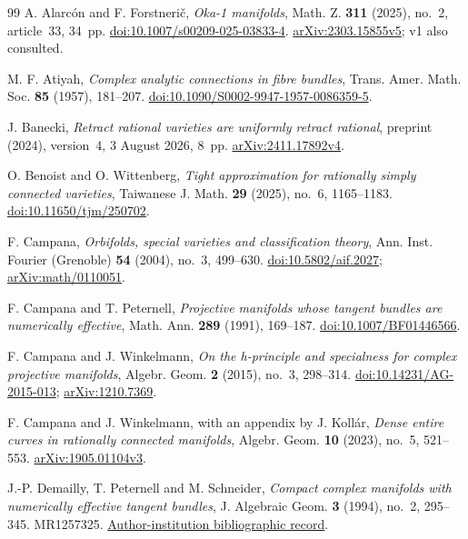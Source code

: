 \documentclass[12pt]{amsart}
\theoremstyle{definition}
\theoremstyle{remark}
\numberwithin{equation}{section}
\begin{document}
\begin{thebibliography}{99}
A. Alarc\'on and F. Forstneri\v c,
\emph{Oka-1 manifolds}, Math. Z. \textbf{311} (2025), no.~2, article~33, 34~pp.
\href{https://doi.org/10.1007/s00209-025-03833-4}{doi:10.1007/s00209-025-03833-4}.
\href{https://arxiv.org/abs/2303.15855v5}{arXiv:2303.15855v5}; v1 also consulted.

M. F. Atiyah, \emph{Complex analytic connections in fibre bundles},
Trans. Amer. Math. Soc. \textbf{85} (1957), 181--207.
\href{https://doi.org/10.1090/S0002-9947-1957-0086359-5}{doi:10.1090/S0002-9947-1957-0086359-5}.

J. Banecki, \emph{Retract rational varieties are uniformly retract rational},
preprint (2024), version~4, 3 August 2026, 8~pp.
\href{https://arxiv.org/abs/2411.17892v4}{arXiv:2411.17892v4}.

O. Benoist and O. Wittenberg,
\emph{Tight approximation for rationally simply connected varieties},
Taiwanese J. Math. \textbf{29} (2025), no.~6, 1165--1183.
\href{https://doi.org/10.11650/tjm/250702}{doi:10.11650/tjm/250702}.

F. Campana, \emph{Orbifolds, special varieties and classification theory},
Ann. Inst. Fourier (Grenoble) \textbf{54} (2004), no.~3, 499--630.
\href{https://doi.org/10.5802/aif.2027}{doi:10.5802/aif.2027};
\href{https://arxiv.org/abs/math/0110051}{arXiv:math/0110051}.

F. Campana and T. Peternell,
\emph{Projective manifolds whose tangent bundles are numerically effective},
Math. Ann. \textbf{289} (1991), 169--187.
\href{https://doi.org/10.1007/BF01446566}{doi:10.1007/BF01446566}.

F. Campana and J. Winkelmann,
\emph{On the h-principle and specialness for complex projective manifolds},
Algebr. Geom. \textbf{2} (2015), no.~3, 298--314.
\href{https://doi.org/10.14231/AG-2015-013}{doi:10.14231/AG-2015-013};
\href{https://arxiv.org/abs/1210.7369}{arXiv:1210.7369}.

F. Campana and J. Winkelmann, with an appendix by J. Koll\'ar,
\emph{Dense entire curves in rationally connected manifolds},
Algebr. Geom. \textbf{10} (2023), no.~5, 521--553.
\href{https://arxiv.org/abs/1905.01104v3}{arXiv:1905.01104v3}.

J.-P. Demailly, T. Peternell and M. Schneider,
\emph{Compact complex manifolds with numerically effective tangent bundles},
J. Algebraic Geom. \textbf{3} (1994), no.~2, 295--345. MR1257325.
\href{https://eref.uni-bayreuth.de/id/eprint/59615/}{Author-institution bibliographic record}.


\end{thebibliography}
\end{document}
